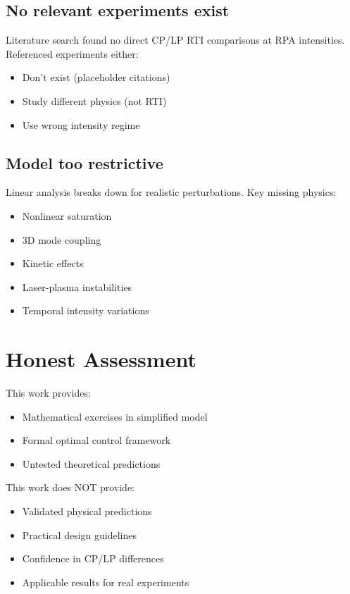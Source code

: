 \documentclass[aps,pre,twocolumn,showpacs,superscriptaddress]{revtex4-2}
\begin{document}
\subsection{No relevant experiments exist}
Literature search found no direct CP/LP RTI comparisons at RPA intensities. Referenced experiments either:
\begin{itemize}
\item Don't exist (placeholder citations)
\item Study different physics (not RTI)
\item Use wrong intensity regime
\end{itemize}

\subsection{Model too restrictive}
Linear analysis breaks down for realistic perturbations. Key missing physics:
\begin{itemize}
\item Nonlinear saturation
\item 3D mode coupling
\item Kinetic effects
\item Laser-plasma instabilities
\item Temporal intensity variations
\end{itemize}

\section{Honest Assessment}

This work provides:
\begin{itemize}
\item Mathematical exercises in simplified model
\item Formal optimal control framework
\item Untested theoretical predictions
\end{itemize}

This work does NOT provide:
\begin{itemize}
\item Validated physical predictions
\item Practical design guidelines
\item Confidence in CP/LP differences
\item Applicable results for real experiments
\end{itemize}
\end{document}
